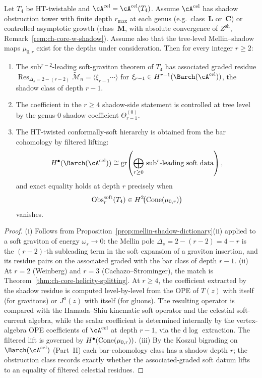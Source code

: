 \begin{theorem}
\label{thm:higher-soft-shadow}
Let $T_4$ be HT-twistable and $\cA^{\mathrm{cel}} = \cA^{\mathrm{cel}}(T_4)$.
Assume $\cA^{\mathrm{cel}}$ has shadow obstruction tower with finite
depth $r_{\max}$ at each genus
(e.g.\ class~$\mathbf L$ or~$\mathbf C$) or controlled asymptotic
growth (class~$\mathbf M$, with absolute convergence of
$Z^{\mathrm{sh}}$, Remark~\ref{rem:ch-core-w-shadow}). Assume also that the tree-level
Mellin--shadow maps \(\mu_{0,r}\) exist for the depths under consideration. Then for every
integer $r\geq 2$:
\begin{enumerate}[label=\textup{(\roman*)}]
\item The sub${}^{r-2}$-leading soft-graviton theorem of $T_4$
has associated graded residue
$\operatorname{Res}_{\Delta_s = 2-(r-2)}
 \widetilde{\mathcal{M}}_n = \langle \xi_{r-1} \cdots\rangle$
for $\xi_{r-1}\in H^{r-1}(\Barch(\cA^{\mathrm{cel}}))$, the shadow
class of depth $r-1$.
\item The coefficient in the \(r\geq4\) shadow-side statement is
controlled at tree level by the genus-$0$ shadow coefficient
$\Theta^{(0)}_{r-1}$.
\item The HT-twisted conformally-soft hierarchy is obtained from the
bar cohomology by filtered lifting:
\[
H^\bullet(\Barch(\cA^{\mathrm{cel}}))
\cong
\gr\!\left(
\bigoplus_{r\geq 0}\,\text{sub}^{r}\text{-leading soft data}
\right),
\]
and exact equality holds at depth $r$ precisely when
\[
\operatorname{Obs}^{\mathrm{soft}}_{r}(T_4)
\in H^2\!\bigl(\operatorname{Cone}(\mu_{0,r})\bigr)
\]
vanishes.
\end{enumerate}
\end{theorem}

\begin{proof}
(i) Follows from Proposition~\ref{prop:mellin-shadow-dictionary}(ii)
applied to a soft graviton of energy $\omega_s\to 0$: the Mellin pole
$\Delta_s = 2 - (r-2) = 4-r$ is the $(r-2)$-th subleading
term in the soft expansion of a graviton insertion, and its residue
pairs on the associated graded with the bar class of depth $r-1$.
(ii) At $r=2$ (Weinberg) and $r=3$ (Cachazo--Strominger), the match is
Theorem~\ref{thm:ch-core-helicity-splitting}. At $r\geq 4$, the
coefficient extracted by the shadow residue is computed level-by-level
from the OPE of $T(z)$ with itself (for gravitons) or $J^a(z)$ with
itself (for gluons). The resulting operator is compared with the
Hamada--Shiu kinematic soft operator and the celestial soft-current
algebra, while the scalar coefficient is determined internally by the
vertex-algebra OPE coefficients of \(\cA^{\mathrm{cel}}\) at depth
\(r-1\), via the \(\mathrm d\log\) extraction. The filtered lift is
governed by
$H^\bullet(\operatorname{Cone}(\mu_{0,r}))$.
(iii) By the Koszul bigrading on $\Barch(\cA^{\mathrm{cel}})$ (Part~II)
each bar-cohomology class has a shadow depth $r$; the obstruction
class records exactly whether the associated-graded soft datum lifts
to an equality of filtered celestial residues.
\end{proof}

